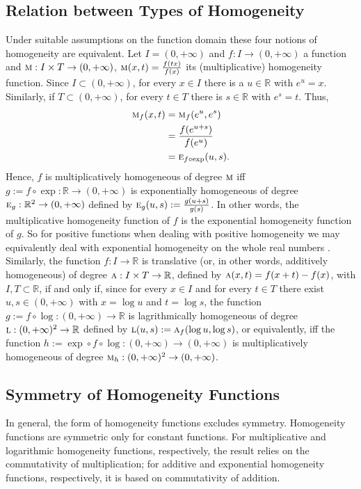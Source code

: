 \documentclass{amsart}
\theoremstyle{plain}
\numberwithin{equation}{section}
\newcommand{\eh}{\textsc{e}}
\newcommand{\R}{{\mathbb{R}}}
\begin{document}
\subsection{Relation between Types of Homogeneity}
Under suitable assumptions on the function domain these four notions of homogeneity are equivalent.
Let $I = (0,+\infty)$ and $f: I \to (0,+\infty)$ a function and $\textsc{m}:I \times T \to (0,+\infty)$,
$\textsc{m}(x,t)=\frac{f(tx)}{f(x)}$ its (multiplicative) homogeneity function.
Since $I \subset (0,+\infty)$, for every $x \in I$ there is a $u \in \R$ with $e^u=x$.
Similarly,  if $T \subset (0,+\infty)$,  for every $t \in T$ there is $s \in \R$ with $e^s=t$. 
Thus,  
\begin{eqnarray*}
\textsc{m}_f (x,t) &= \textsc{m}_{ f}(e^u,  e^s)\\
&=
\frac{f(e^{u+s})}{f(e^u)}\\
&=
\eh_{f \circ \exp }(u,s).
\end{eqnarray*}
Hence,  $f$ is multiplicatively homogeneous of degree $\textsc{m}$ iff $g:=f \circ \exp :\R \to (0 ,+ \infty)$
is exponentially homogeneous of degree $\eh_g :\R^2 \to (0, +\infty) $ defined by 
$\eh_g (u,s):=\frac{g(u+s)}{g(s)}$. 
In other words,  
the multiplicative homogeneity function of $f$ is the exponential homogeneity function of $g$.
So for positive functions when dealing with positive homogeneity
we may equivalently deal with exponential homogeneity on the whole real numbers .\\

Similarly,  the function $f: I \to \R$ is translative (or, in other words, additively homogeneous) of degree
$\textsc{a}: I \times T \to \R$,  defined by $\textsc{a}(x,t)=f(x+t)-f(x)$,  
with $I, T \subset \R$, if and only if,  
since for every $x \in I$ and for every $t \in T$ there exist $u,s \in (0,+\infty)$ with $x=\log{u}$ and $t=\log{s}$,
the function $g:=f \circ \log : (0,+\infty) \to \R$ is lagrithmically homogeneous of degree
$\textsc{l}:  (0,+\infty)^2 \to \R $ defined by $\textsc{l}(u,s):=\textsc{a}_f (\log{u},  \log{s} )$,
or equivalently, 
iff the function $h:=\exp \circ f \circ \log: (0,+\infty) \to (0,+\infty) $ is multiplicatively homogeneous of degree 
 $\textsc{m}_h :  (0,+\infty)^2 \to (0,+\infty)$.

\subsection{Symmetry of Homogeneity Functions}
In general, the form of homogeneity functions 
excludes symmetry.
Homogeneity functions are symmetric only for constant functions.
For multiplicative and logarithmic  homogeneity functions, respectively, 
the result relies on the commutativity of multiplication;
for additive and exponential homogeneity functions, respectively,
it is based on
commutativity of addition.
\end{document}
